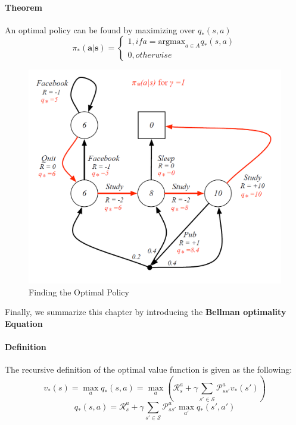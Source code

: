 \documentclass{article}
\begin{document}
	\paragraph{Theorem}
	An optimal policy can be found by maximizing over $q_*(s,a)$ 
	\begin{equation*}
	\pi_*(\mathbf{a|s}) = \begin{cases}
	1, if a = \mathrm{argmax}_{a \in A} q_*(s,a)\\
	0, otherwise
	\end{cases}
	\end{equation*}
	
	\begin{figure}[h]
		\centering
		\includegraphics[scale=0.5]{ch2fig6.png}
		\caption{Finding the Optimal Policy}
	\end{figure}
	
	Finally, we summarize this chapter by introducing the \textbf{Bellman optimality Equation}
	\paragraph{Definition} The recursive definition of the optimal value function is given as the following:
	\begin{equation*}
	v_*(s) = \max_a q_*(s,a) = \max_a (\mathcal{R}^a_s + \gamma \sum_{s' \in \mathcal{S}}\mathcal{P}^a_{ss'}v_*(s'))
	\end{equation*}
	\begin{equation*}
	q_*(s,a) = \mathcal{R}^a_s + \gamma \sum_{s' \in \mathcal{S}} \mathcal{P}^a_{ss'} \max_{a'} q_*(s',a')
	\end{equation*}
	
\end{document}
